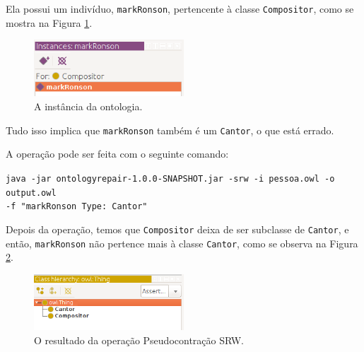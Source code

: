 Ela possui um indivíduo, \texttt{markRonson}, pertencente à classe \texttt{Compositor}, como se mostra na Figura \ref{img:srw2}.

\begin{figure}[H]
	\centering
	\includegraphics[width=0.5\textwidth]{Capitulos/Implementacao/srw2.png}
	\caption{A instância da ontologia.}
	\label{img:srw2}
\end{figure}

Tudo isso implica que \texttt{markRonson} também é um \texttt{Cantor}, o que está errado. 

A operação pode ser feita com o seguinte comando:

\begin{small}
	\texttt{java -jar ontologyrepair-1.0.0-SNAPSHOT.jar -srw -i pessoa.owl -o output.owl \\ -f "markRonson Type: Cantor"}
\end{small}

Depois da operação, temos que \texttt{Compositor} deixa de ser subclasse de \texttt{Cantor}, e então, \texttt{markRonson} não pertence mais à classe \texttt{Cantor}, como se observa na Figura \ref{img:srw3}.

\begin{figure}[H]
	\centering
	\includegraphics[width=0.5\textwidth]{Capitulos/Implementacao/srw3.png}
	\caption{O resultado da operação Pseudocontração SRW.}
	\label{img:srw3}
\end{figure}
